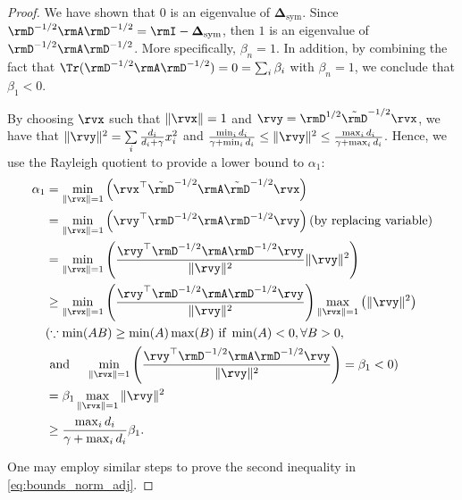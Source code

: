 \begin{proof}

We have shown that 0 is an eigenvalue of $\boldsymbol{\Delta}_{\text{sym}}$. Since $\rmD^{-1/2}\rmA \rmD^{-1/2} = \rmI - \boldsymbol{\Delta}_{\text{sym}}$, then $1$ is an eigenvalue of $\rmD^{-1/2}\rmA \rmD^{-1/2}$. More specifically, $\beta_n = 1$. In addition, by combining the fact that $\Tr(\rmD^{-1/2}\rmA\rmD^{-1/2})=0=\sum_i \beta_i$ with $\beta_n = 1$, we conclude that $\beta_1 < 0$.

By choosing $\rvx$ such that $\lVert \rvx \rVert =1$ and $\rvy=\rmD^{1/2}\tilde{\rmD}^{-1/2} \rvx$, we have that $\|\rvy\|^2=\sum\limits_i\frac{d_i}{d_i+\gamma}x_i^2$ and $\frac{\min_i d_i}{\gamma+\min_i d_i}\leq \|\rvy\|^2\leq \frac{\max_i d_i}{\gamma+\max_i d_i}$. Hence, we use the Rayleigh quotient to provide a lower bound to $\alpha_1$:
\begin{align*}
\alpha_1 & = \min_{\|\rvx\|=1} \left(\rvx^\top\tilde{\rmD}^{-1/2} \rmA \tilde{\rmD}^{-1/2} \rvx \right) \\
& = \min_{\|\rvx\|=1} \left( \rvy^\top\rmD^{-1/2} \rmA \rmD^{-1/2} \rvy \right) \text{(by replacing variable)} \\
&= \min_{\|\rvx\|=1} \left( \frac{\rvy^\top\rmD^{-1/2} \rmA \rmD^{-1/2}\rvy}{\|\rvy\|^2}\|\rvy\|^2 \right) \\
&\geq \min_{\|\rvx\|=1} \left( \frac{\rvy^\top\rmD^{-1/2} \rmA \rmD^{-1/2} \rvy}{\|\rvy\|^2} \right) \max_{\|\rvx\|=1} \left( \|\rvy\|^2 \right) \\
& ( \because  \min (AB) \geq \min (A) \max(B) \text{ if } \min (A) < 0, \forall B > 0,
\\
&\text{ and \quad} 
\min_{\|\rvx\|=1} \left( \frac{\rvy^\top\rmD^{-1/2} \rmA \rmD^{-1/2} \rvy}{\|\rvy\|^2} \right) = \beta_1 < 0 ) \\
&= \beta_1\max_{\|\rvx\|=1} \|\rvy\|^2 \\
&\geq \frac{\max_i d_i}{\gamma+\max_i d_i}\beta_1.\\
 \end{align*}

One may employ similar steps to prove the second inequality in \autoref{eq:bounds_norm_adj}.

\end{proof}

